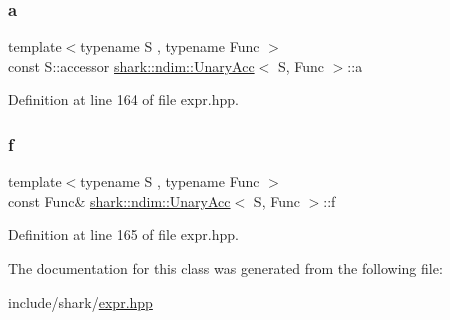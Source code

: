 \subsubsection{\texorpdfstring{a}{a}}
{\footnotesize\ttfamily template$<$typename S , typename Func $>$ \\
const S\+::accessor \hyperlink{classshark_1_1ndim_1_1_unary_acc}{shark\+::ndim\+::\+Unary\+Acc}$<$ S, Func $>$\+::a\hspace{0.3cm}{\ttfamily [private]}}



Definition at line 164 of file expr.\+hpp.

\hypertarget{classshark_1_1ndim_1_1_unary_acc_a8a6488ae3b1f64726413bd49721e05b3}{}\label{classshark_1_1ndim_1_1_unary_acc_a8a6488ae3b1f64726413bd49721e05b3} 
\subsubsection{\texorpdfstring{f}{f}}
{\footnotesize\ttfamily template$<$typename S , typename Func $>$ \\
const Func\& \hyperlink{classshark_1_1ndim_1_1_unary_acc}{shark\+::ndim\+::\+Unary\+Acc}$<$ S, Func $>$\+::f\hspace{0.3cm}{\ttfamily [private]}}



Definition at line 165 of file expr.\+hpp.



The documentation for this class was generated from the following file\+:\begin{DoxyCompactItemize}
\item 
include/shark/\hyperlink{expr_8hpp}{expr.\+hpp}\end{DoxyCompactItemize}
